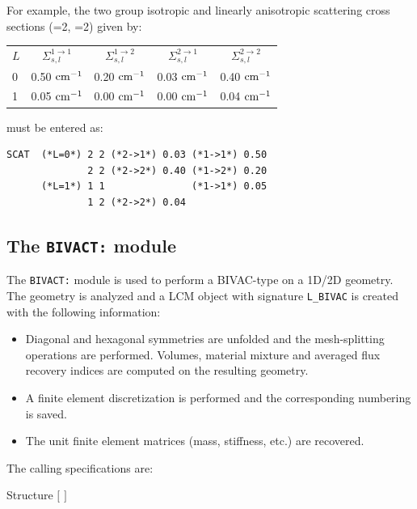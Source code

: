 For example, the two group isotropic and linearly anisotropic scattering
cross sections (=2, =2) given by:

\begin{center}
\begin{tabular}{lcccc}
$L$ & $\Sigma_{s,l}^{1\to 1}$ & $\Sigma_{s,l}^{1\to 2}$
    & $\Sigma_{s,l}^{2\to 1}$ & $\Sigma_{s,l}^{2\to 2}$ \\
0   & 0.50 ${\rm cm}^{-1}$ & 0.20 ${\rm cm}^{-1}$ & 0.03 ${\rm cm}^{-1}$ & 0.40 ${\rm cm}^{-1}$ \\
1   & 0.05 ${\rm cm}^{-1}$ & 0.00 ${\rm cm}^{-1}$ & 0.00 ${\rm cm}^{-1}$ & 0.04 ${\rm cm}^{-1}$ 
\end{tabular}
\end{center}

\noindent must be entered as:

\begin{verbatim}
SCAT  (*L=0*) 2 2 (*2->1*) 0.03 (*1->1*) 0.50 
              2 2 (*2->2*) 0.40 (*1->2*) 0.20 
      (*L=1*) 1 1               (*1->1*) 0.05 
              1 2 (*2->2*) 0.04             
\end{verbatim}
\clearpage

\subsection{The {\tt BIVACT:} module}\label{sect:bivact}

The {\tt BIVACT:} module is used to perform  a BIVAC-type  on a 1D/2D geometry.\cite{bivac,benaboud,SVAT1}
The geometry is analyzed and a LCM object with signature {\tt L\_BIVAC} is created with the following information:
\begin{itemize}
\item Diagonal and hexagonal symmetries are unfolded and the mesh-splitting operations are performed. Volumes, material mixture and averaged flux recovery indices are computed on the resulting geometry.
\item A finite element discretization is performed and the corresponding numbering is saved.
\item The unit finite element matrices (mass, stiffness, etc.) are recovered.
\end{itemize}

The calling specifications are:

\begin{DataStructure}{Structure }
 \moc{:=}  $[$  $]$   \moc{::} 
\end{DataStructure}

